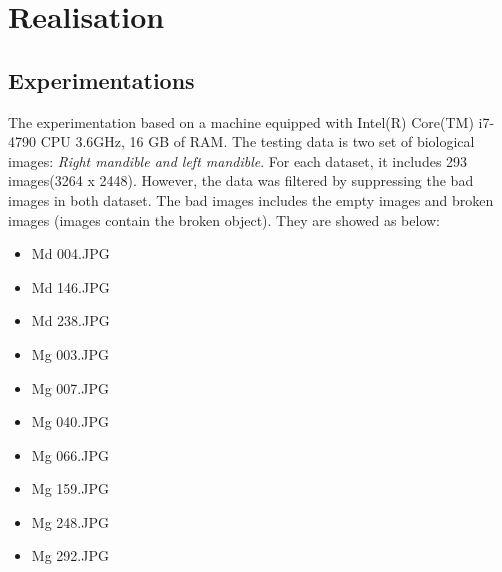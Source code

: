 \chapter{Realisation}
\section{Experimentations}
The experimentation based on a machine equipped with Intel(R) Core(TM) i7-4790 CPU 3.6GHz, 16 GB of RAM. The testing data is two set of biological images: \textit{Right mandible and left mandible}. For each dataset, it includes 293 images(3264 x 2448). However, the data was filtered by suppressing the bad images in both dataset. The bad images includes the empty images and broken images (images contain the broken object). They are showed as below:
\begin{multicols}{3}
\begin{itemize}
\item Md 004.JPG
\item Md 146.JPG
\item Md 238.JPG
\item Mg 003.JPG
\item Mg 007.JPG
\item Mg 040.JPG
\item Mg 066.JPG
\item Mg 159.JPG
\item Mg 248.JPG
\item Mg 292.JPG
\end{itemize} 
\end{multicols}
